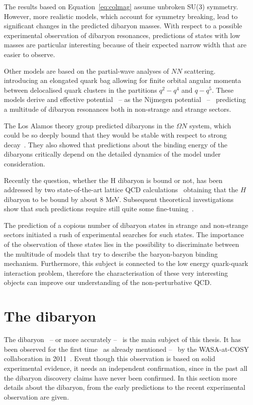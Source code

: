 The results based on Equation~\ref{eq:colmag} assume unbroken SU(3) symmetry.
However, more realistic models, which account for symmetry breaking, lead to significant changes
in the predicted dibaryon masses.
With respect to a possible experimental observation of dibaryon resonances, predictions of states
with low masses are particular interesting because of their expected narrow width that are easier
to observe.

Other models are based on the partial-wave analyses of $NN$ scattering.
introducing an elongated quark bag allowing for finite orbital angular momenta between
delocalised quark clusters in the partitions $q^{2}-q^{4}$ and $q-q^{5}$. 
These models derive and effective potential \ -- as the Nijmegen 
potential~\cite{dibpred1,dibpred2,dibpred3} -- \ predicting a multitude of dibaryon resonances
both in non-strange and strange sectors. 

The Los Alamos theory group predicted dibaryons in the $\Omega N$ system, which could be so
deeply bound that they would be stable with respect to strong 
decay~\cite{dsinevitable1,dsinevitable2}.
They also showed that predictions about the binding energy of the dibaryons critically depend
on the detailed dynamics of the model under consideration.

Recently the question, whether the H dibaryon is bound or not, has been addressed by two 
state-of-the-art lattice QCD calculations~\cite{Hlattice1,Hlattice2} obtaining
that the $H$ dibaryon to be bound by about 8 MeV.
Subsequent theoretical investigations show that such predictions require still quite some
fine-tuning~\cite{Hlattice3}.

The prediction of a copious number of dibaryon states in strange and non-strange sectors 
initiated a rush of experimental searches for such states. 
The importance of the observation of these states lies in the possibility to discriminate
between the multitude of models that try to describe the baryon-baryon binding mechanism.
Furthermore, this subject is connected to the low energy quark-quark interaction problem,
therefore the characterisation of these very interesting objects can improve our 
understanding of the non-perturbative QCD.

%
%
\section{The \dst dibaryon} \label{sec:2.2}

The \ds dibaryon \ -- or more accurately \dst -- \ is the main subject of this thesis.
It has been observed for the first time \ as already mentioned -- \ by the WASA-at-COSY 
collaboration in 2011~\cite{wasa1}.
Event though this observation is based on solid experimental evidence, it needs an independent
confirmation, since in the past all the dibaryon discovery claims have never been confirmed.
In this section more details about the \ds dibaryon, from the early predictions to the 
recent experimental observation are given.

